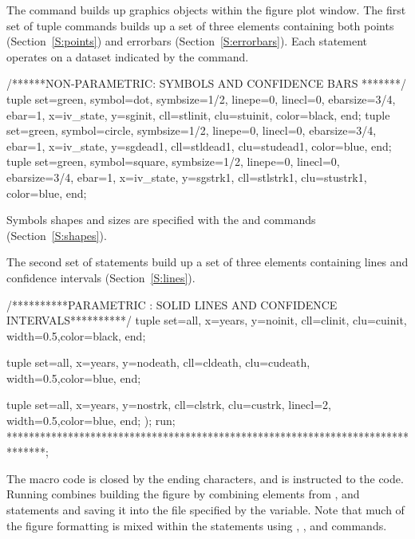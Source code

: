 \documentclass[nojss]{jss}\usepackage[]{graphicx}\usepackage[]{color}
\begin{document}
The  command builds up graphics objects within the figure plot window. The first set of tuple commands builds up a set of three elements containing both points (Section~\ref{S:points}) and errorbars (Section~\ref{S:errorbars}). Each  statement operates on a dataset indicated by the  command. 
\begin{CodeChunk}\small
\begin{CodeInput}
/******NON-PARAMETRIC: SYMBOLS AND CONFIDENCE BARS *******/
tuple set=green, symbol=dot, symbsize=1/2, linepe=0, linecl=0,
    ebarsize=3/4, ebar=1,
    x=iv_state, y=sginit, cll=stlinit, clu=stuinit, color=black, 
    end;
tuple set=green, symbol=circle, symbsize=1/2, linepe=0, linecl=0,
    ebarsize=3/4, ebar=1,
    x=iv_state, y=sgdead1, cll=stldead1, clu=studead1, color=blue, 
    end;
tuple set=green, symbol=square, symbsize=1/2, linepe=0, linecl=0,
    ebarsize=3/4, ebar=1,
    x=iv_state, y=sgstrk1, cll=stlstrk1, clu=stustrk1, color=blue, 
    end;
\end{CodeInput}
\end{CodeChunk}
Symbols shapes and sizes are specified with the  and  commands (Section~\ref{S:shapes}).

The second set of  statements build up a set of three elements containing lines and confidence intervals (Section~\ref{S:lines}).
\begin{CodeChunk}\small
\begin{CodeInput}

/**********PARAMETRIC : SOLID LINES AND CONFIDENCE INTERVALS**********/      
tuple set=all, x=years, y=noinit, cll=clinit, clu=cuinit,
    width=0.5,color=black, 
    end;

tuple set=all, x=years, y=nodeath, cll=cldeath, clu=cudeath,
    width=0.5,color=blue, 
    end;

tuple set=all, x=years, y=nostrk, cll=clstrk, clu=custrk,
    linecl=2, width=0.5,color=blue, 
    end;
);
run;
*******************************************************************************;
\end{CodeInput}
\end{CodeChunk}

The  macro code is closed by the ending \code{);} characters, and  is instructed to  the code. Running combines building the figure by combining elements from ,  and  statements and saving it into the file specified by the  variable. Note that much of the figure formatting is mixed within the  statements using , ,  and  commands. 
\end{document}
